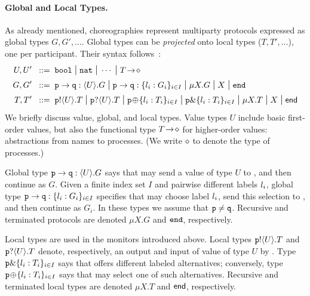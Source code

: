 \documentclass[runningheads,plain]{llncs}
\begin{document}
\paragraph{Global and Local Types.}
As already mentioned, choreographies represent multiparty protocols expressed as global types $G, G', \ldots$. Global types can be \emph{projected} onto local types  ($T, T', \ldots$), one per participant. Their syntax follows~\cite{HYC08}:
\begin{align*}
			U, U'  \bnfis & \bool \sbnfbar \nat \sbnfbar \cdots %
			\sbnfbar \shot{T} \\
			G, G'  \bnfis & \gtcom{p}{q}{U}{G} %
			\sbnfbar
			\gtcho{p}{q}{\lbl_i}{G_i} %
			\sbnfbar %
			\mu X. G \sbnfbar X \sbnfbar \gend \\
	    	T, T'  \bnfis & \ltout{p}{U}{T} \sbnfbar \ltinp{p}{U}{T} %
		  \sbnfbar %
		  \ltsel{p}{\lbl_i}{T_i}{i}{I} \sbnfbar \ltbra{p}{\lbl_i}{T_i}{i}{I}  
		\sbnfbar  \mu X. T \sbnfbar X \sbnfbar \lend 
\end{align*}
\noindent
We briefly discuss value, global, and local types. 
Value types $U$ include basic first-order values,   but also 
the functional type $T\! \rightarrow\! \diamond$ for {higher-order} values: abstractions from names to processes. 
(We write $\diamond$ to denote the type of processes.)

Global type $\mathtt{p}\to\mathtt{q}:\langle U\rangle.G$ says that \p may send a value of type $U$ to \q, and then continue as $G$.
Given a finite index set $I$ and pairwise different {labels} $l_i$, global type $\mathtt{p}\to\mathtt{q}:\{l_i:G_i\}_{i \in I}$ specifies that  \p may choose  label $l_i$, send this selection to \q, and then continue as $G_i$.
In these types %
we assume that $\mathtt{p} \neq \mathtt{q}$.
Recursive and terminated protocols are denoted $\mu X. G$ and $\mathtt{end}$, respectively.

Local types are used in the monitors introduced above. 
Local types
$\mathtt{p}!\langle U\rangle.T$ and $\mathtt{p}?\langle U\rangle.T$ denote, respectively, an output and input of value of type $U$ by \p.
Type $\mathtt{p}\&\{l_i: T_i\}_{i \in I}$ says that \p 
offers different labeled alternatives;
conversely, type $\mathtt{\mathtt{p}}\!\oplus\!\{l_i: T_i\}_{i \in I}$ 
says that \p may select one of such alternatives.
Recursive and terminated local types are denoted $\mu X. T$ and $\mathsf{end}$, respectively. 
 
\end{document}
